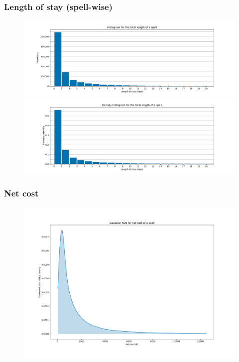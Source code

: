 \documentclass{beamer}
\begin{document}
\begin{frame}
    \frametitle{Length of stay (spell-wise)}

    \begin{figure}
        \begin{minipage}{\linewidth}
            \includegraphics[width=\linewidth]{./img/LOS_freq_hist.pdf}
        \end{minipage}
        \begin{minipage}{\linewidth}
            \includegraphics[width=\linewidth]{./img/LOS_density_hist.pdf}
        \end{minipage}
    \end{figure}
\end{frame}

\begin{frame}
    \frametitle{Net cost}

    \begin{figure}
        \includegraphics[width=\linewidth]{./img/netcost_kde.pdf}
    \end{figure}
\end{frame}
\end{document}
